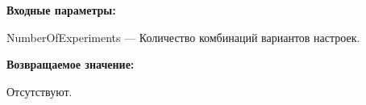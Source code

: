 \textbf{Входные параметры:}

NumberOfExperiments --- Количество комбинаций вариантов настроек.

\textbf{Возвращаемое значение:}

Отсутствуют.